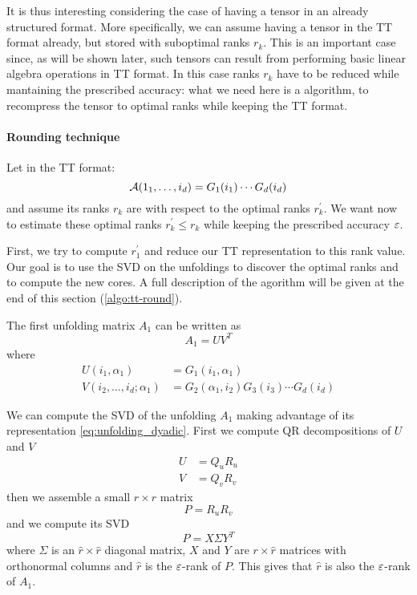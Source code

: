 It is thus interesting considering the case of having a tensor in an already structured format. More specifically, we can assume having a tensor in the TT format already, but stored with suboptimal ranks $r_k$. This is an important case since, as will be shown later, such tensors can result from performing basic linear algebra operations in TT format. In this case ranks $r_k$ have to be reduced while mantaining the prescribed accuracy: what we need here is a  algorithm, to recompress the tensor to optimal ranks while keeping the TT format.

\paragraph{Rounding technique}
Let \A in the TT format:
\begin{equation*}
  \mathcal{A}(1_1,\ldots,i_d) = G_1(i_1) \cdots G_d(i_d)
\end{equation*}
and assume its ranks $r_k$ are  with respect to the optimal ranks $r_k^\prime$. We want now to estimate these optimal ranks $r_k^\prime \le r_k$ while keeping the prescribed accuracy $\varepsilon$.

First, we try to compute $r_1^\prime$ and reduce our TT representation to this rank value. Our goal is to use the SVD on the unfoldings to discover the optimal ranks and to compute the new  cores. A full description of the agorithm will be given at the end of this section (\ref{algo:tt-round}).

The first unfolding matrix $A_1$ can be written as
\begin{equation} \label{eq:unfolding_dyadic}
  A_1 = UV^T
\end{equation}
where
\begin{equation} \label{def:UV}
  \begin{split}
    U(i_1,\alpha_1) &= G_1(i_1,\alpha_1)\\
    V(i_2,\ldots,i_d;\alpha_1) &= G_2(\alpha_1,i_2) G_3(i_3) \cdots G_d(i_d)
  \end{split}
\end{equation}

We can compute the SVD of the unfolding $A_1$ making advantage of its representation \eqref{eq:unfolding_dyadic}. First we compute QR decompositions of $U$ and $V$
\begin{equation*}
  \begin{split}
    U &= Q_u R_u\\
    V &= Q_v R_v
  \end{split}
\end{equation*}
then we assemble a small $r \times r$ matrix
\begin{equation*}
  P = R_u R_v
\end{equation*}
and we compute its SVD
\begin{equation*}
  P = X \Sigma Y^T
\end{equation*}
where $\Sigma$ is an $\hat{r}\times\hat{r}$ diagonal matrix, $X$ and $Y$ are $r \times \hat{r}$ matrices with orthonormal columns and $\hat{r}$ is the $\varepsilon$-rank of $P$. This gives that $\hat{r}$ is also the $\varepsilon$-rank of $A_1$.


